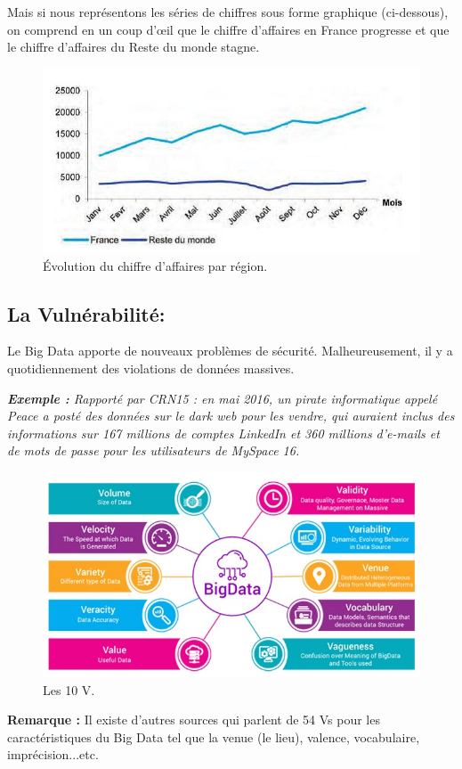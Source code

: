 Mais si nous représentons les séries de chiffres sous forme graphique (ci-dessous), on comprend en un coup d'œil que le chiffre d'affaires en France progresse et que le chiffre d'affaires du Reste du monde stagne.

\begin{figure}[h]
 \centering
 \includegraphics[scale=0.8]{img/fig4_}
 \caption{Évolution du chiffre d'affaires par région.}
\end{figure}

\subsection{La Vulnérabilité:}
Le Big Data apporte de nouveaux problèmes de sécurité. Malheureusement, il y a quotidiennement des violations de données massives.

\textit{\textbf{Exemple :} Rapporté par CRN15 : en mai 2016, un pirate informatique appelé Peace a posté des données sur le dark web pour les vendre, qui auraient inclus des informations sur 167 millions de comptes LinkedIn et 360 millions d'e-mails et de mots de passe pour les utilisateurs de MySpace 16.}

\begin{figure}[h]
 \centering
 \includegraphics[scale=0.6]{img/fig5_}
 \caption{Les 10 V.}
\end{figure}

\textbf{Remarque :} Il existe d'autres sources qui parlent de 54 Vs pour les caractéristiques du Big Data tel que la venue (le lieu), valence, vocabulaire, imprécision...etc.






